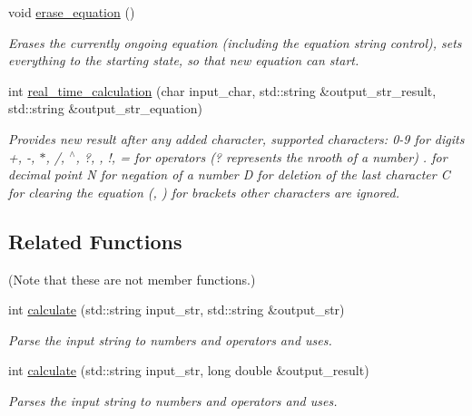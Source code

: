 \begin{DoxyCompactItemize}
void \mbox{\hyperlink{class_logic_a168e83ee3c44c0fb69a97ad9d26645b1}{erase\+\_\+equation}} ()
\begin{DoxyCompactList}\small\item\em Erases the currently ongoing equation (including the equation string control), sets everything to the starting state, so that new equation can start. \end{DoxyCompactList}\item 
int \mbox{\hyperlink{class_logic_a109d65be4a56e17e256d83bcc6912acb}{real\+\_\+time\+\_\+calculation}} (char input\+\_\+char, std\+::string \&output\+\_\+str\+\_\+result, std\+::string \&output\+\_\+str\+\_\+equation)
\begin{DoxyCompactList}\small\item\em Provides new result after any added character, supported characters\+: \textquotesingle{}0\textquotesingle{}-\/\textquotesingle{}9\textquotesingle{} for digits \textquotesingle{}+\textquotesingle{}, \textquotesingle{}-\/\textquotesingle{}, \textquotesingle{}$\ast$\textquotesingle{}, \textquotesingle{}/\textquotesingle{}, \textquotesingle{}$^\wedge$\textquotesingle{}, \textquotesingle{}?\textquotesingle{}, \textquotesingle{}\textquotesingle{}, \textquotesingle{}!\textquotesingle{}, \textquotesingle{}=\textquotesingle{} for operators (\textquotesingle{}?\textquotesingle{} represents the nrooth of a number) \textquotesingle{}.\textquotesingle{} for decimal point \textquotesingle{}N\textquotesingle{} for negation of a number \textquotesingle{}D\textquotesingle{} for deletion of the last character \textquotesingle{}C\textquotesingle{} for clearing the equation \textquotesingle{}(\textquotesingle{}, \textquotesingle{})\textquotesingle{} for brackets other characters are ignored. \end{DoxyCompactList}\end{DoxyCompactItemize}
\subsection*{Related Functions}
(Note that these are not member functions.) \begin{DoxyCompactItemize}
\item 
int \mbox{\hyperlink{class_logic_a93c8b12c4525549e7da3731ae7c53c7c}{calculate}} (std\+::string input\+\_\+str, std\+::string \&output\+\_\+str)
\begin{DoxyCompactList}\small\item\em Parse the input string to numbers and operators and uses. \end{DoxyCompactList}\item 
int \mbox{\hyperlink{class_logic_acd1683cf5265bacac5e0710ddb123e03}{calculate}} (std\+::string input\+\_\+str, long double \&output\+\_\+result)
\begin{DoxyCompactList}\small\item\em Parses the input string to numbers and operators and uses. \end{DoxyCompactList}\end{DoxyCompactItemize}


